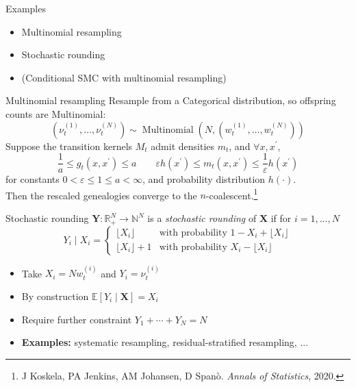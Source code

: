 \documentclass[aspectratio=169]{beamer}
\theoremstyle{definition}
\newcommand{\E}{\mathbb{E}}
\newcommand{\Mn}{\operatorname{Multinomial}}
\newcommand{\vt}[2][t]{\nu_{#1}^{(#2)}}
\newcommand{\wt}[2][t]{w_{#1}^{(#2)}}
\begin{document}
\begin{frame}{Examples}
\begin{itemize}
\item Multinomial resampling
\item Stochastic rounding 
\item (Conditional SMC with multinomial resampling)
\end{itemize}
\end{frame}


\begin{frame}{Multinomial resampling}
Resample from a Categorical distribution, so offspring counts are Multinomial:
\begin{equation*}
(\vt{1} , \dots, \vt{N}) \sim \Mn \left( N, (\wt{1},\dots,\wt{N}) \right)
\end{equation*}
\pause
Suppose the transition kernels $M_t$ admit densities $m_t$, and $\forall x, x^\prime$,
\begin{equation*}
\frac{1}{a} \leq g_t(x, x^\prime) \leq a \qquad
\varepsilon h(x^\prime) \leq m_t(x, x^\prime) \leq \frac{1}{\varepsilon} h(x^\prime) 
\end{equation*}
for constants $0<\varepsilon\leq 1\leq a<\infty$, and probability distribution $h(\cdot)$.\\[10pt]
\pause
Then the rescaled genealogies converge to the $n$-coalescent.\footnote{J Koskela, PA Jenkins, AM Johansen, D Span\`o. \textit{Annals of Statistics}, 2020.}
\end{frame}


\begin{frame}{Stochastic rounding}
$\mathbf{Y}: \mathbb{R}_+^N \to \mathbb{N}^N$ is a \emph{stochastic rounding} of $\mathbf{X}$ if for $i=1,\dots,N$
\begin{equation*}
Y_i \mid X_i =
\begin{cases}
 \lfloor X_i \rfloor & \text{with probability } 1- X_i + \lfloor X_i \rfloor \\
  \lfloor X_i \rfloor +1 & \text{with probability } X_i - \lfloor X_i \rfloor 
\end{cases}
\end{equation*}
\pause
\begin{itemize}
\item Take $X_i = N\wt{i}$ and $Y_i = \vt{i}$
\item By construction $\E[Y_i \mid \mathbf{X}] = X_i$
\item Require further constraint $Y_1 + \cdots + Y_N = N$
\pause
\item \textbf{Examples:} systematic resampling, residual-stratified resampling, ...
\end{itemize}
\end{frame}
\end{document}
